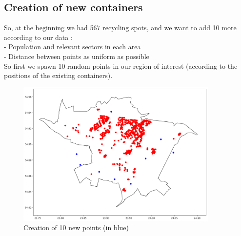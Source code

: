 \subsection{Creation of new containers}
So, at the beginning we had 567 recycling spots, and we want to add 10 more according to our data :\\
- Population and relevant sectors in each area\\
- Distance between points as uniform as possible\\
So first we spawn 10 random points in our region of interest (according to the positions of the existing containers).

\begin{figure}[H]
    \centering
    \includegraphics[width=10cm]{images/part3/pointsNewRandom.png}
    \caption{Creation of 10 new points (in blue)}
    \label{fig:newpoints}
\end{figure}
